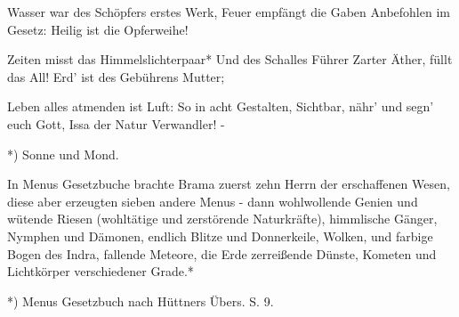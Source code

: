 \documentclass[a4paper, 11pt, oneside, polutonikogreek, german]{article}
\begin{document}
Wasser war des Schöpfers erstes Werk,
Feuer empfängt die Gaben
Anbefohlen im Gesetz:
Heilig ist die Opferweihe!

Zeiten misst das Himmelslichterpaar*
Und des Schalles Führer
Zarter Äther, füllt das All!
Erd' ist des Gebührens Mutter;

Leben alles atmenden ist Luft:
So in acht Gestalten,
Sichtbar, nähr' und segn' euch Gott,
Issa der Natur Verwandler! -

*) Sonne und Mond.

In Menus Gesetzbuche brachte Brama zuerst zehn Herrn der erschaffenen Wesen, diese aber erzeugten sieben andere Menus - dann wohlwollende Genien und wütende Riesen (wohltätige und zerstörende Naturkräfte), himmlische Gänger, Nymphen und Dämonen, endlich Blitze und Donnerkeile, Wolken, und farbige Bogen des Indra, fallende Meteore, die Erde zerreißende Dünste, Kometen und Lichtkörper verschiedener Grade.*

*) Menus Gesetzbuch nach Hüttners Übers. S. 9.
\end{document}
